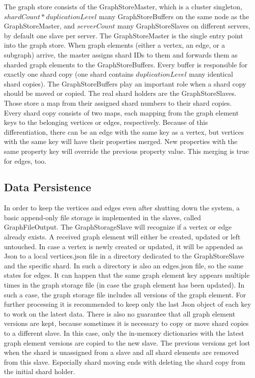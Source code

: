 \documentclass{sigchi}
\begin{document}
The graph store consists of the GraphStoreMaster, which is a cluster singleton, $shardCount * duplicationLevel$ many GraphStoreBuffers on the same node as the GraphStoreMaster, and $serverCount$ many GraphStoreSlaves on different servers, by default one slave per server. The GraphStoreMaster is the single entry point into the graph store. When graph elements (either a vertex, an edge, or a subgraph) arrive, the master assigns shard IDs to them and forwards them as sharded graph elements to the GraphStoreBuffers. Every buffer is responsible for exactly one shard copy (one shard contains $duplicationLevel$ many identical shard copies). The GraphStoreBuffers play an important role when a shard copy should be moved or copied. The real shard holders are the GraphStoreSlaves. Those store a map from their assigned shard numbers to their shard copies. Every shard copy consists of two maps, each mapping from the graph element keys to the belonging vertices or edges, respectively. Because of this differentiation, there can be an edge with the same key as a vertex, but vertices with the same key will have their properties merged. New properties with the same property key will override the previous property value. This merging is true for edges, too.

\subsection{Data Persistence}

In order to keep the vertices and edges even after shutting down the system, a basic append-only file storage is implemented in the slaves, called GraphFileOutput. The GraphStorageSlave will recognize if a vertex or edge already exists. A received graph element will either be created, updated or left untouched. In case a vertex is newly created or updated, it will be appended as Json to a local vertices.json file in a directory dedicated to the GraphStoreSlave and the specific shard. In such a directory is also an edges.json file, so the same states for edges. It can happen that the same graph element key appears multiple times in the graph storage file (in case the graph element has been updated). In such a case, the graph storage file includes all versions of the graph element. For further processing it is recommended to keep only the last Json object of each key to work on the latest data. There is also no guarantee that all graph element versions are kept, because sometimes it is necessary to copy or move shard copies to a different slave. In this case, only the in-memory dictionaries with the latest graph element versions are copied to the new slave. The previous versions get lost when the shard is unassigned from a slave and all shard elements are removed from this slave. Especially shard moving ends with deleting the shard copy from the initial shard holder.
\end{document}
